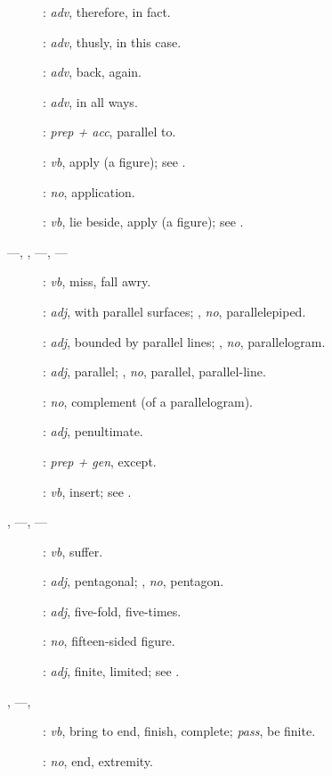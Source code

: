 {\begin{description}
\item[]: {\em adv}, therefore, in fact.
\item[]: {\em adv}, thusly, in this case.
\item[]: {\em adv}, back, again.
\item[]: {\em adv}, in all ways.
\item[]: {\em prep + acc}, parallel to.
\item[]: {\em vb}, apply (a figure); see .
\item[]: {\em no}, application.
\item[]: {\em vb}, lie beside, apply (a figure); see .
\item[  ---, , ---, ---]: {\em vb}, miss, fall awry.
\item[]: {\em adj}, with parallel surfaces; , {\em no}, parallelepiped.
\item[]: {\em adj}, bounded by parallel
lines; , {\em no}, parallelogram.
\item[]: {\em adj}, parallel; , {\em no},
parallel, parallel-line.
\item[]: {\em no}, complement (of a parallelogram).
\item[]: {\em adj}, penultimate.
\item[]: {\em prep + gen}, except.
\item[]: {\em vb}, insert; see .
\item[, ---, ---]: {\em vb}, suffer.
\item[]: {\em adj}, pentagonal; ,
{\em no}, pentagon.
\item[]: {\em adj}, five-fold, five-times.
\item[]: {\em no}, fifteen-sided figure.
\item[]: {\em adj}, finite, limited; see \-.
\item[, ---, ]: {\em vb}, bring to end, finish, complete; {\em pass},  be finite.
\item[]: {\em no}, end, extremity.

\end{description}}
